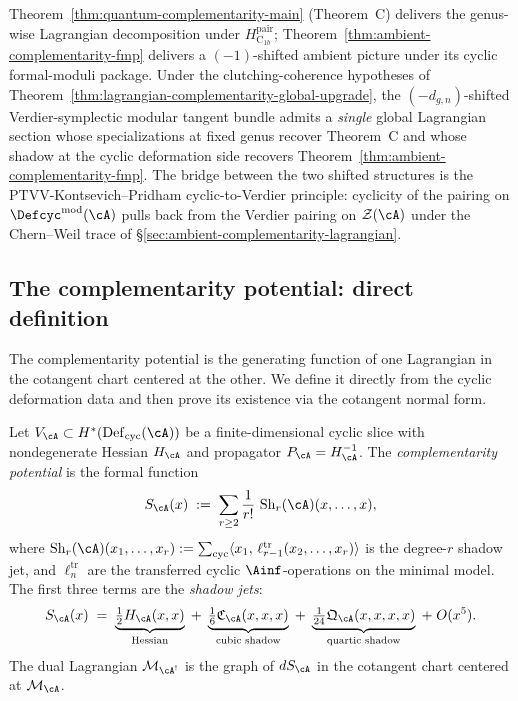\begin{remark}
\label{rem:platonic-upgrade-lagrangian-global}
Theorem~\textup{\ref{thm:quantum-complementarity-main}} (Theorem~C)
delivers the genus-wise Lagrangian decomposition under
$H_{\mathrm C_{1b}}^{\mathrm{pair}}$;
Theorem~\textup{\ref{thm:ambient-complementarity-fmp}}
delivers a $(-1)$-shifted ambient picture under its cyclic formal-moduli
package.  Under the clutching-coherence hypotheses of
Theorem~\ref{thm:lagrangian-complementarity-global-upgrade}, the
$(-d_{g,n})$-shifted Verdier-symplectic modular tangent bundle admits a
\emph{single} global Lagrangian section whose
specializations at fixed genus recover Theorem~C and whose shadow
at the cyclic deformation side recovers Theorem~\textup{\ref{thm:ambient-complementarity-fmp}}.
The bridge between the two shifted structures is the
PTVV-Kontsevich--Pridham cyclic-to-Verdier principle: cyclicity of the
pairing on $\Defcyc^{\mathrm{mod}}(\cA)$ pulls back from the Verdier
pairing on $\mathcal{Z}(\cA)$ under the Chern--Weil trace of
\S\ref{sec:ambient-complementarity-lagrangian}.
\end{remark}

\subsection{The complementarity potential: direct definition}
\label{subsec:cotangent-normal-form}

The complementarity potential is the generating function of one
Lagrangian in the cotangent chart centered at the other. We define
it directly from the cyclic deformation data and then prove its
existence via the cotangent normal form.

\begin{definition}
\label{def:complementarity-potential}
Let $V_{\cA} \subset H^*(\operatorname{Def}_{\mathrm{cyc}}(\cA))$
be a finite-dimensional cyclic slice with nondegenerate Hessian
$H_{\cA}$ and propagator $P_{\cA} = H_{\cA}^{-1}$. The
\emph{complementarity potential} is the formal function
\begin{equation}
\label{eq:complementarity-potential-direct}
S_{\cA}(x)
\;:=\;
\sum_{r \geq 2} \frac{1}{r!}\,
\operatorname{Sh}_r(\cA)(x, \ldots, x),
\end{equation}
where $\operatorname{Sh}_r(\cA)(x_1,\ldots,x_r)
:= \sum_{\mathrm{cyc}} \langle x_1,\,
\ell_{r-1}^{\mathrm{tr}}(x_2,\ldots,x_r)\rangle$
is the degree-$r$ shadow jet, and $\ell_n^{\mathrm{tr}}$ are the
transferred cyclic $\Ainf$-operations on the minimal model.
The first three terms are the \emph{shadow jets}:
\begin{equation}
\label{eq:shadow-jets-direct}
S_{\cA}(x)
\;=\;
\underbrace{\tfrac12 H_{\cA}(x,x)}_{\text{Hessian}}
\;+\;
\underbrace{\tfrac{1}{6}\mathfrak{C}_{\cA}(x,x,x)}_{\text{cubic shadow}}
\;+\;
\underbrace{\tfrac{1}{24}\mathfrak{Q}_{\cA}(x,x,x,x)}_{\text{quartic shadow}}
\;+\; O(x^5).
\end{equation}
The dual Lagrangian $\mathcal{M}_{\cA^!}$ is the graph of $dS_{\cA}$
in the cotangent chart centered at $\mathcal{M}_{\cA}$.
\end{definition}

